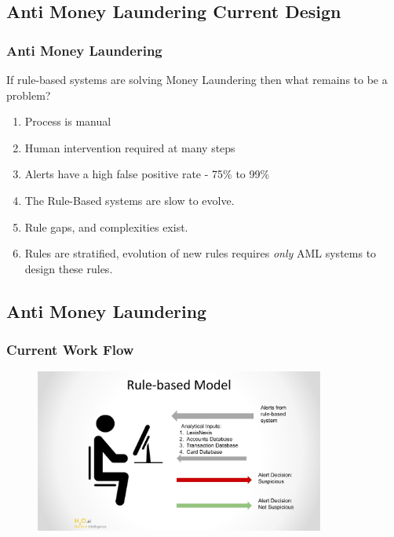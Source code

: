 \documentclass[11pt,
               aspectratio=169,
               hyperref={colorlinks}
               ]{beamer}
\begin{document}
	\subsection{Anti Money Laundering Current Design}
	\begin{frame}
		\frametitle{Anti Money Laundering}

		If rule-based systems are solving Money Laundering then what remains to be a problem?\\
		\begin{enumerate}
			\item Process is manual
			\item Human intervention required at many steps
			\item Alerts have a high false positive rate - 75\% to 99\%
			\item The Rule-Based systems are slow to evolve. 
			\item Rule gaps, and complexities exist. 
			\item Rules are stratified, evolution of new rules requires \textit{only} AML systems to design these rules. 
		\end{enumerate}
	\end{frame}

		\subsection{Anti Money Laundering}
	\begin{frame}
		\frametitle{Current Work Flow}
		\begin{figure}[htb]
			\begin{center}
				\includegraphics[width=0.85\textwidth]{slide_resources/Berlin-Meetup-AML.png}
				\label{fig:workflow}
			\end{center}
		\end{figure}
	\end{frame}
\end{document}
